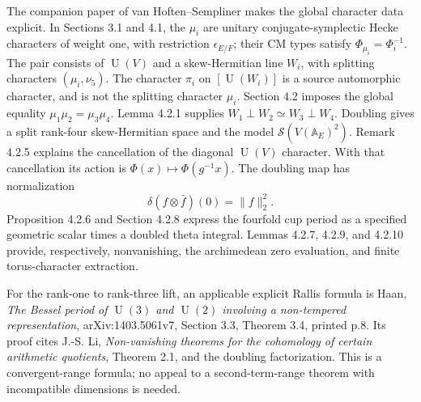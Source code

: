 \documentclass[11pt]{article}
\newcommand{\A}{\mathbb A}
\newcommand{\U}{\operatorname{U}}
\begin{document}
The companion paper of van Hoften--Sempliner makes the global character
data explicit. In Sections 3.1 and 4.1, the $\mu_i$ are unitary
conjugate-symplectic Hecke characters of weight one, with restriction
$\epsilon_{E/F}$; their CM types satisfy
$\Phi_{\mu_i}=\Phi_i^{-1}$. The pair consists of $\U(V)$ and a
skew-Hermitian line $W_i$, with splitting characters $(\mu_i,\nu_5)$.
The character $\pi_i$ on $[\U(W_i)]$ is a source automorphic character,
and is not the splitting character $\mu_i$. Section 4.2 imposes the
global equality $\mu_1\mu_2=\mu_3\mu_4$. Lemma 4.2.1 supplies
$W_1\perp W_2\simeq W_3\perp W_4$. Doubling gives a split rank-four
skew-Hermitian space and the model $\mathcal S(V(\A_E)^2)$.
Remark 4.2.5 explains the cancellation of the diagonal $\U(V)$ character.
With that cancellation its action is $\Phi(x)\mapsto\Phi(g^{-1}x)$.
The doubling map has normalization
\[
 \delta(f\otimes\bar f)(0)=\|f\|_2^2.
\]
Proposition 4.2.6 and Section 4.2.8 express the fourfold cup period as a
specified geometric scalar times a doubled theta integral. Lemmas
4.2.7, 4.2.9, and 4.2.10 provide, respectively, nonvanishing, the
archimedean zero evaluation, and finite torus-character extraction.

For the rank-one to rank-three lift, an applicable explicit Rallis
formula is Haan, \emph{The Bessel period of $\U(3)$ and $\U(2)$ involving
a non-tempered representation}, arXiv:1403.5061v7, Section 3.3,
Theorem 3.4, printed p.8. Its proof cites J.-S. Li, \emph{Non-vanishing
theorems for the cohomology of certain arithmetic quotients}, Theorem
2.1, and the doubling factorization. This is a convergent-range
formula; no appeal to a second-term-range theorem with incompatible
dimensions is needed.
\end{document}
